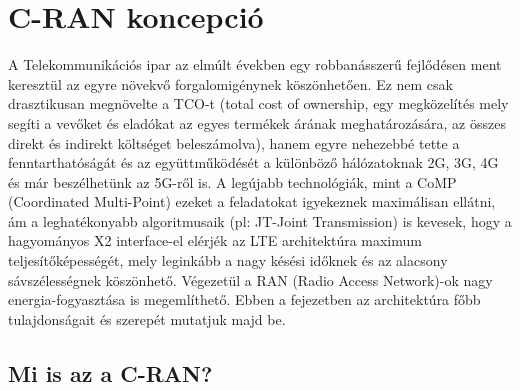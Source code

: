\chapter{C-RAN koncepció}\label{sect:CranConcept}
A Telekommunikációs ipar az elmúlt években egy robbanásszerű fejlődésen ment keresztül az egyre növekvő forgalomigénynek köszönhetően.
Ez nem csak drasztikusan megnövelte a TCO-t (total cost of ownership, egy megközelítés mely segíti a vevőket és eladókat az egyes termékek árának meghatározására, az összes direkt és indirekt költséget beleszámolva), hanem egyre nehezebbé tette a fenntarthatóságát és az együttműködését a különböző hálózatoknak 2G, 3G, 4G és már beszélhetünk az 5G-ről is.\cite{RecentCRANProg}
A legújabb technológiák, mint a CoMP (Coordinated Multi-Point) ezeket a feladatokat igyekeznek maximálisan ellátni, ám a leghatékonyabb algoritmusaik (pl: JT-Joint Transmission) is kevesek, hogy a hagyományos X2 interface-el elérjék az LTE architektúra maximum teljesítőképességét, mely leginkább a nagy késési időknek és az alacsony sávszélességnek köszönhető. \cite{CoMP}
Végezetül a RAN (Radio Access Network)-ok nagy energia-fogyasztása is megemlíthető.
Ebben a fejezetben az architektúra főbb tulajdonságait és szerepét mutatjuk majd be.
\section{Mi is az a C-RAN?}

